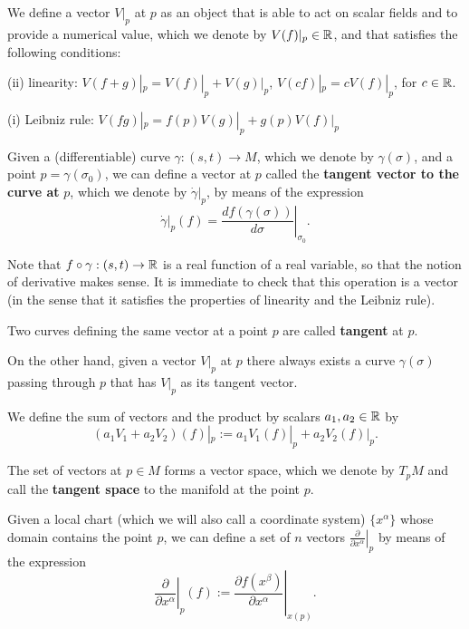 \begin{points}
\item We define a vector $V|_p$ at $p$ as an object that is able to act on scalar fields and to provide a numerical value, which we denote by $V(f)|_p\in\mathbb{R}$, and that satisfies the following conditions:

(ii) linearity: $V(f+g)|_p=V(f)|_p+V(g)|_p$, \quad $V(cf)|_p=cV(f)|_p$, for $c\in\mathbb{R}$.

(i) Leibniz rule: $V(fg)|_p=f(p)V(g)|_p+g(p)V(f)|_p$

\item Given a (differentiable) curve $\gamma:(s,t)\to M$, which we denote by $\gamma(\sigma)$, and a point $p=\gamma(\sigma_0)$, we can define a vector at $p$ called the \textbf{tangent vector to the curve at} $p$, which we denote by $\dot\gamma|_p$, by means of the expression
\[
  \dot\gamma|_p(f)=\left.\frac{d f(\gamma(\sigma))}{d\sigma}\right|_{\sigma_0}.
\]

\item Note that $f\circ\gamma:(s,t)\to\mathbb{R}$ is a real function of a real variable, so that the notion of derivative makes sense. It is immediate to check that this operation is a vector (in the sense that it satisfies the properties of linearity and the Leibniz rule).

\item Two curves defining the same vector at a point $p$ are called \textbf{tangent} at $p$.

\item On the other hand, given a vector $V|_p$ at $p$ there always exists a curve $\gamma(\sigma)$ passing through $p$ that has $V|_p$ as its tangent vector.

\item We define the sum of vectors and the product by scalars $a_1,a_2\in\mathbb{R}$ by
\[
  \left(a_1V_1+a_2V_2\right)(f)|_p:=a_1V_1(f)|_p+a_2V_2(f)|_p .
\]

\item The set of vectors at $p\in M$ forms a vector space, which we denote by $T_pM$ and call the \textbf{tangent space} to the manifold at the point $p$.

\item Given a local chart (which we will also call a coordinate system) $\{x^\alpha\}$ whose domain contains the point $p$, we can define a set of $n$ vectors $\left.\frac{\partial}{\partial x^\alpha}\right|_p$ by means of the expression
\[
  \left.\frac{\partial}{\partial x^\alpha}\right|_p(f):=\left.\frac{\partial f(x^\beta)}{\partial x^\alpha}\right|_{x(p)} .
\]


\end{points}

